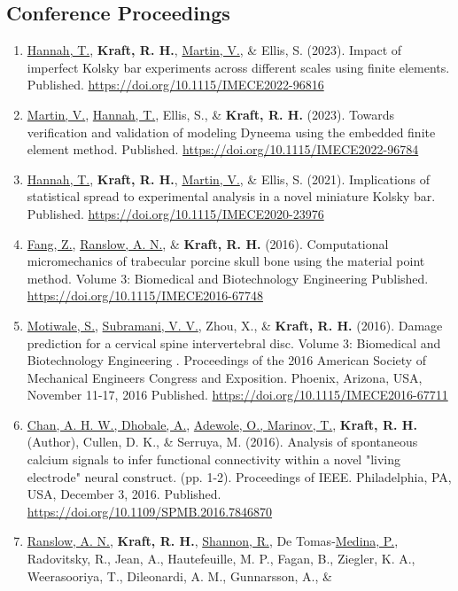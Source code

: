 \documentclass[a4paper,10pt]{article}
\begin{document}
    \subsection*{Conference Proceedings}
    \begin{enumerate}
      \item \underline{Hannah, T.}, \textbf{\textbf{Kraft,} R. H.}, \underline{Martin, V.}, \&
 Ellis, S. (2023). Impact of imperfect Kolsky bar experiments across different scales using finite elements. Published. \url{https://doi.org/10.1115/IMECE2022-96816}
  \item \underline{Martin, V.}, \underline{Hannah, T.}, Ellis, S., \&
 \textbf{\textbf{Kraft,} R. H.} (2023). Towards verification and validation of modeling Dyneema using the embedded finite element method. Published. \url{https://doi.org/10.1115/IMECE2022-96784}
  \item \underline{Hannah, T.}, \textbf{\textbf{Kraft,} R. H.}, \underline{Martin, V.}, \&
 Ellis, S. (2021). Implications of statistical spread to experimental analysis in a novel miniature Kolsky bar. Published. \url{https://doi.org/10.1115/IMECE2020-23976}
  \item \underline{Fang, Z.}, \underline{Ranslow, A. N.}, \&
 \textbf{\textbf{Kraft,} R. H.} (2016). Computational micromechanics of trabecular porcine skull bone using the material point method. Volume 3: Biomedical and Biotechnology Engineering Published. \url{https://doi.org/10.1115/IMECE2016-67748}
  \item \underline{Motiwale, S.}, \underline{Subramani, V. V.}, Zhou, X., \&
 \textbf{\textbf{Kraft,} R. H.} (2016). Damage prediction for a cervical spine intervertebral disc. Volume 3: Biomedical and Biotechnology Engineering . Proceedings of the 2016 American Society of Mechanical Engineers Congress and Exposition.  
Phoenix, Arizona, USA, November 11-17, 2016 Published. \url{https://doi.org/10.1115/IMECE2016-67711}
  \item \underline{Chan, A. H. W., Dhobale, A.}, \underline{Adewole, O., Marinov, T.}, \textbf{\textbf{Kraft,} R. H.} (Author), Cullen, D. K., \&
 Serruya, M. (2016). Analysis of spontaneous calcium signals to infer functional connectivity within a novel "living electrode" neural construct. (pp. 1-2). Proceedings of IEEE.  
Philadelphia, PA, USA, December 3, 2016. Published. \url{https://doi.org/10.1109/SPMB.2016.7846870}
  \item \underline{Ranslow, A. N.}, \textbf{\textbf{Kraft,} R. H.}, \underline{Shannon, R.}, De Tomas-\underline{Medina, P.}, Radovitsky, R., Jean, A., Hautefeuille, M. P., Fagan, B., Ziegler, K. A., Weerasooriya, T., Dileonardi, A. M., Gunnarsson, A., \&

\end{enumerate}
\end{document}
